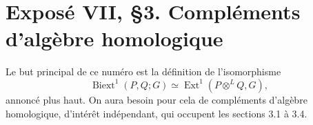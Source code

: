 \documentclass[11pt]{article}
\providecommand{\Ker}{\operatorname{Ker}}
\providecommand{\Ext}{\operatorname{Ext}}
\providecommand{\id}{\operatorname{id}}
\begin{document}
\providecommand{\Biext}{\operatorname{Biext}}
\providecommand{\GrAb}{\operatorname{GrAb}}
\providecommand{\Coker}{\operatorname{Coker}}
\providecommand{\coker}{\operatorname{coker}}
\providecommand{\Ker}{\operatorname{Ker}}
\providecommand{\cofib}{\operatorname{cofib}}
\providecommand{\Dcat}{\mathrm D}
\providecommand{\Kcat}{\mathrm K}
\providecommand{\cPsi}{\mathcal\Psi}
\providecommand{\cY}{\mathcal Y}
\providecommand{\cC}{\mathcal C}
\providecommand{\cT}{\mathcal T}
\providecommand{\Hh}{\mathrm H}
\providecommand{\Tot}{\operatorname{Tot}}
\providecommand{\id}{\operatorname{id}}


\section*{Expos\'e VII, \S3. Compl\'ements d'alg\`ebre homologique}

Le but principal de ce num\'ero est la d\'efinition de l'isomorphisme
\begin{equation}\tag{3.0.1}
  \Biext^1(P,Q;G)\simeq \Ext^1(P\otimes^{L}Q,G),
\end{equation}
annonc\'e plus haut.  On aura besoin pour cela de compl\'ements d'alg\`ebre homologique, d'int\'er\^et ind\'ependant, qui occupent les sections 3.1 \`a 3.4.
\end{document}
